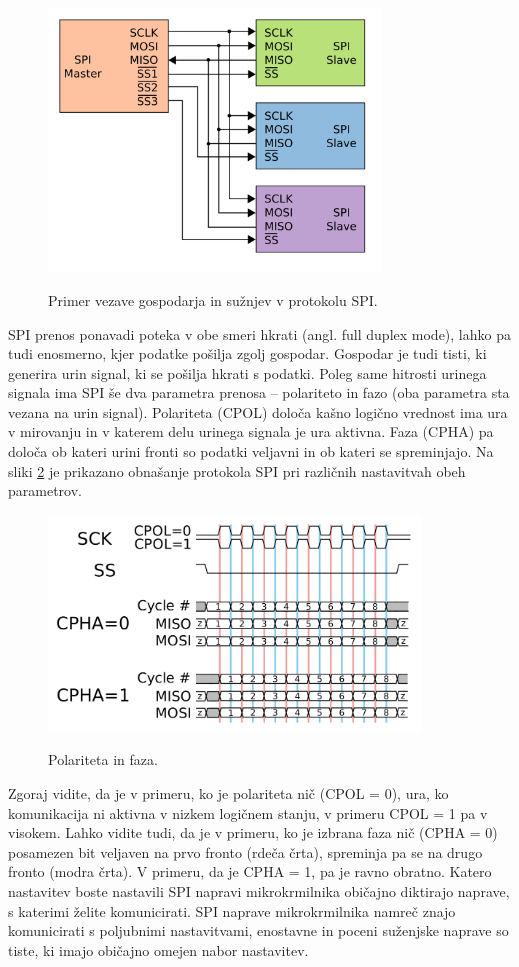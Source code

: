 \documentclass[12pt,letterpaper]{article}
\begin{document}
\begin{figure}[ht!]
  \centering
  \caption{Primer vezave gospodarja in sužnjev v protokolu SPI.}
  \includegraphics[width=250pt]{images/vaja5/SPI_three_slaves.png}
  \label{SPImasterslave}
\end{figure}

SPI prenos ponavadi poteka v obe smeri hkrati (angl. full duplex mode), lahko pa tudi enosmerno, kjer podatke pošilja zgolj gospodar. Gospodar je tudi tisti, ki generira urin signal, ki se pošilja hkrati s podatki. Poleg same hitrosti urinega signala ima SPI še dva parametra prenosa -- polariteto in fazo (oba parametra sta vezana na urin signal). Polariteta (CPOL) določa kašno logično vrednost ima ura v mirovanju in v katerem delu urinega signala je ura aktivna. Faza (CPHA) pa določa ob kateri urini fronti so podatki veljavni in ob kateri se spreminjajo. Na sliki \ref{SPIpolarity_phase} je prikazano obnašanje protokola SPI pri različnih nastavitvah obeh parametrov.

\begin{figure}[ht!]
  \centering
  \caption{Polariteta in faza.}
  \includegraphics[width=280pt]{images/vaja5/SPI_polarity_phase.png}
  \label{SPIpolarity_phase}
\end{figure}

Zgoraj vidite, da je v primeru, ko je polariteta nič (CPOL = 0), ura, ko komunikacija ni aktivna v nizkem logičnem stanju, v primeru CPOL = 1 pa v visokem. Lahko vidite tudi, da je v primeru, ko je izbrana faza nič (CPHA = 0) posamezen bit veljaven na prvo fronto (rdeča črta), spreminja pa se na drugo fronto (modra črta). V primeru, da je CPHA = 1, pa je ravno obratno. Katero nastavitev boste nastavili SPI napravi mikrokrmilnika običajno diktirajo naprave, s katerimi želite komunicirati. SPI naprave mikrokrmilnika namreč znajo komunicirati s poljubnimi nastavitvami, enostavne in poceni suženjske naprave so tiste, ki imajo običajno omejen nabor nastavitev.
\end{document}

